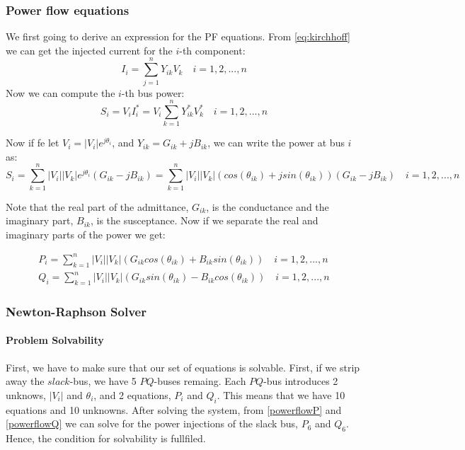 \documentclass[a4paper,11pt, titlepage, twoside]{article}
\begin{document}
\subsubsection{Power flow equations}

We first going to derive an expression for the PF equations.
From \ref{eq:kirchhoff} we can get the injected current for the $i$-th component:
\begin{equation}
    I_i = \sum_{j=1}^{n} Y_{ik}V_k \quad i = 1,2,...,n
\end{equation}
Now we can compute the $i$-th bus power:
\begin{equation}
    S_i = V_iI_i^* = V_i\sum_{k=1}^{n} Y_{ik}^*V_k^* \quad i = 1,2,...,n
\end{equation}

Now if fe let $V_i = |V_i|e^{j\theta_i}$, and $Y_{ik} = G_{ik} + jB_{ik}$, we can write the power at bus $i$ as:
\begin{equation}
    S_i = \sum_{k=1}^n|V_i||V_k|e^{j\theta_i}(G_{ik} - jB_{ik}) = \sum_{k=1}^n|V_i||V_k|(cos(\theta_{ik})+jsin(\theta_{ik}))(G_{ik} - jB_{ik}) \quad i = 1,2,...,n
\end{equation}

Note that the real part of the admittance, $G_{ik}$, is the conductance and the imaginary part, $B_{ik}$, is the susceptance. Now if we separate the real and imaginary parts of the power we get:

\begin{align}
    P_i= \sum_{k=1}^n|V_i||V_k|(G_{ik}cos(\theta_{ik}) + B_{ik}sin(\theta_{ik}))\label{powerflowP} \quad i= 1,2,...,n \\
    Q_i= \sum_{k=1}^n|V_i||V_k|(G_{ik}sin(\theta_{ik}) - B_{ik}cos(\theta_{ik}))\label{powerflowQ} \quad i= 1,2,...,n
\end{align}  


\subsubsection{Newton-Raphson Solver}

\paragraph{Problem Solvability}

First, we have to make sure that our set of equations is solvable. First, if we strip away the $slack$-bus, we have 5 $PQ$-buses remaing. Each $PQ$-bus introduces 2 unknows, $|V_i|$ and $\theta_i$, and 2 equations, $P_i$ and $Q_i$. This means that we have 10 equations and 10 unknowns. 
After solving the system, from \ref{powerflowP} and \ref{powerflowQ} we can solve for the power injections of the slack bus, $P_6$ and $Q_6$. Hence, the condition for solvability is fullfiled.
\end{document}
